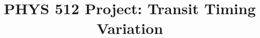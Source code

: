 \documentclass[linenumbers]{aastex631}
\begin{document}
\title{PHYS 512 Project: Transit Timing Variation}


\end{document}
